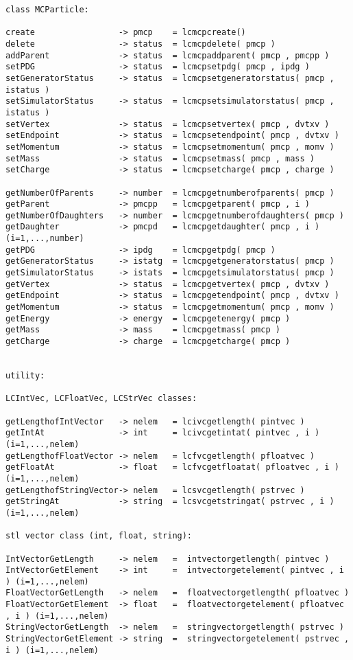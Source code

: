 \begin{scriptsize}
\begin{verbatim}
class MCParticle:

create                 -> pmcp    = lcmcpcreate()
delete                 -> status  = lcmcpdelete( pmcp )
addParent              -> status  = lcmcpaddparent( pmcp , pmcpp )
setPDG                 -> status  = lcmcpsetpdg( pmcp , ipdg )
setGeneratorStatus     -> status  = lcmcpsetgeneratorstatus( pmcp , istatus )
setSimulatorStatus     -> status  = lcmcpsetsimulatorstatus( pmcp , istatus )
setVertex              -> status  = lcmcpsetvertex( pmcp , dvtxv )
setEndpoint            -> status  = lcmcpsetendpoint( pmcp , dvtxv )
setMomentum            -> status  = lcmcpsetmomentum( pmcp , momv )
setMass                -> status  = lcmcpsetmass( pmcp , mass )
setCharge              -> status  = lcmcpsetcharge( pmcp , charge )

getNumberOfParents     -> number  = lcmcpgetnumberofparents( pmcp )
getParent              -> pmcpp   = lcmcpgetparent( pmcp , i )
getNumberOfDaughters   -> number  = lcmcpgetnumberofdaughters( pmcp )
getDaughter            -> pmcpd   = lcmcpgetdaughter( pmcp , i )  (i=1,...,number)
getPDG                 -> ipdg    = lcmcpgetpdg( pmcp )
getGeneratorStatus     -> istatg  = lcmcpgetgeneratorstatus( pmcp )
getSimulatorStatus     -> istats  = lcmcpgetsimulatorstatus( pmcp )
getVertex              -> status  = lcmcpgetvertex( pmcp , dvtxv )
getEndpoint            -> status  = lcmcpgetendpoint( pmcp , dvtxv )
getMomentum            -> status  = lcmcpgetmomentum( pmcp , momv )
getEnergy              -> energy  = lcmcpgetenergy( pmcp )
getMass                -> mass    = lcmcpgetmass( pmcp )
getCharge              -> charge  = lcmcpgetcharge( pmcp )


utility: 

LCIntVec, LCFloatVec, LCStrVec classes:

getLengthofIntVector   -> nelem   = lcivcgetlength( pintvec )
getIntAt               -> int     = lcivcgetintat( pintvec , i ) (i=1,...,nelem)
getLengthofFloatVector -> nelem   = lcfvcgetlength( pfloatvec )
getFloatAt             -> float   = lcfvcgetfloatat( pfloatvec , i ) (i=1,...,nelem)
getLengthofStringVector-> nelem   = lcsvcgetlength( pstrvec )
getStringAt            -> string  = lcsvcgetstringat( pstrvec , i ) (i=1,...,nelem)

stl vector class (int, float, string):

IntVectorGetLength     -> nelem   =  intvectorgetlength( pintvec )
IntVectorGetElement    -> int     =  intvectorgetelement( pintvec , i ) (i=1,...,nelem)
FloatVectorGetLength   -> nelem   =  floatvectorgetlength( pfloatvec )
FloatVectorGetElement  -> float   =  floatvectorgetelement( pfloatvec , i ) (i=1,...,nelem)
StringVectorGetLength  -> nelem   =  stringvectorgetlength( pstrvec )
StringVectorGetElement -> string  =  stringvectorgetelement( pstrvec , i ) (i=1,...,nelem)

\end{verbatim}

\end{scriptsize}



